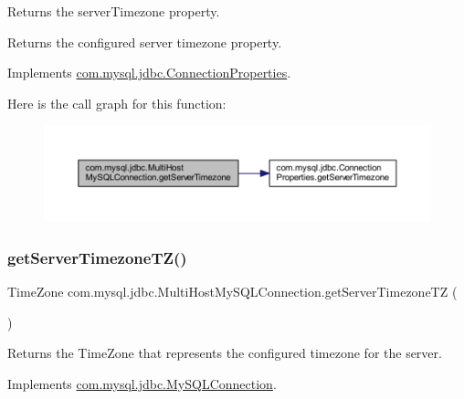 Returns the \textquotesingle{}server\+Timezone\textquotesingle{} property.

\begin{DoxyReturn}{Returns}
the configured server timezone property. 
\end{DoxyReturn}


Implements \mbox{\hyperlink{interfacecom_1_1mysql_1_1jdbc_1_1_connection_properties_a488c241668bba62e720eea31fde52512}{com.\+mysql.\+jdbc.\+Connection\+Properties}}.

Here is the call graph for this function\+:
\nopagebreak
\begin{figure}[H]
\begin{center}
\leavevmode
\includegraphics[width=350pt]{classcom_1_1mysql_1_1jdbc_1_1_multi_host_my_s_q_l_connection_a1aeab5021006a43eb885c10f945a747c_cgraph}
\end{center}
\end{figure}
\mbox{\label{classcom_1_1mysql_1_1jdbc_1_1_multi_host_my_s_q_l_connection_a6cd4e5250d8940bbbfeb6d5a4a4efb45}} 
\subsubsection{\texorpdfstring{get\+Server\+Timezone\+T\+Z()}{getServerTimezoneTZ()}}
{\footnotesize\ttfamily Time\+Zone com.\+mysql.\+jdbc.\+Multi\+Host\+My\+S\+Q\+L\+Connection.\+get\+Server\+Timezone\+TZ (\begin{DoxyParamCaption}{ }\end{DoxyParamCaption})}

Returns the Time\+Zone that represents the configured timezone for the server. 

Implements \mbox{\hyperlink{interfacecom_1_1mysql_1_1jdbc_1_1_my_s_q_l_connection_a28586f911062106cb730733427568fc7}{com.\+mysql.\+jdbc.\+My\+S\+Q\+L\+Connection}}.

